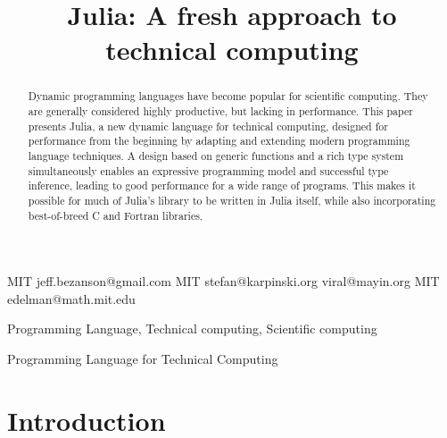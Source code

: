 \documentclass[11pt]{sigplanconf}
\begin{document}


\title{Julia: A fresh approach to technical computing}

           {MIT}
           {jeff.bezanson@gmail.com}
           {MIT}
           {stefan@karpinski.org}
           {}
           {viral@mayin.org}
           {MIT}
           {edelman@math.mit.edu}

\maketitle
\begin{abstract}
  Dynamic programming languages have become popular for scientific
  computing. They are generally considered highly productive, but
  lacking in performance. This paper presents Julia, a new dynamic
  language for technical computing, designed for performance from the
  beginning by adapting and extending modern programming language
  techniques. A design based on generic functions and a rich type
  system simultaneously enables an expressive programming model and
  successful type inference, leading to good performance for a wide
  range of programs. This makes it possible for much of Julia's
  library to be written in Julia itself, while also incorporating
  best-of-breed C and Fortran libraries.
\end{abstract}


Programming Language, Technical computing, Scientific computing

Programming Language for Technical Computing

\section{Introduction}
\end{document}
